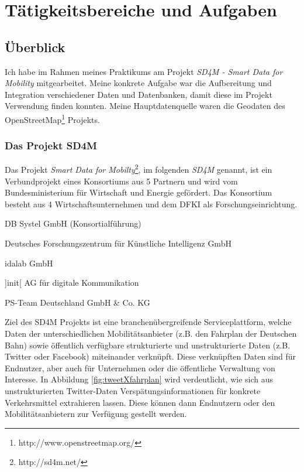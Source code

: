 \chapter{Tätigkeitsbereiche und Aufgaben}
\label{sec:main}
\section{Überblick}
\label{sec:main:overview}
Ich habe im Rahmen meines Praktikums am Projekt \textit{SD4M - Smart Data for Mobility} mitgearbeitet.
Meine konkrete Aufgabe war die Aufbereitung und Integration verschiedener Daten und Datenbanken, damit diese im Projekt Verwendung finden konnten. Meine Hauptdatenquelle waren die Geodaten des OpenStreetMap\footnote{http://www.openstreetmap.org/} Projekts.
\subsection{Das Projekt SD4M}
\label{sec:main:overview:sd4m}
Das Projekt \textit{Smart Data for Mobilty}\footnote{http://sd4m.net/}, im folgenden \textit{SD4M} genannt, ist ein Verbundprojekt eines Konsortiums aus 5 Partnern und wird vom Bundesministerium für Wirtschaft und Energie gefördert.
Das Konsortium besteht aus 4 Wirtschaftsunternehmen und dem DFKI als Forschungseinrichtung.
\begin{compactitem}
  \item DB Systel GmbH (Konsortialführung)
  \item Deutsches Forschungszentrum für Künstliche Intelligenz GmbH
  \item idalab GmbH
  \item ]init[ AG für digitale Kommunikation
  \item PS-Team Deutschland GmbH & Co. KG
\end{compactitem}
Ziel des SD4M Projekts ist eine branchenübergreifende Serviceplattform, welche Daten der unterschiedlichen Mobilitätsanbieter (z.B. den Fahrplan der Deutschen Bahn) sowie öffentlich verfügbare strukturierte und unstrukturierte Daten (z.B. Twitter oder Facebook) miteinander verknüpft.
Diese verknüpften Daten sind für Endnutzer, aber auch für Unternehmen oder die öffentliche Verwaltung von Interesse.
In Abbildung \ref{fig:tweetXfahrplan} wird verdeutlicht, wie sich aus unstrukturierten Twitter-Daten Verspätungsinformationen für konkrete Verkehrsmittel extrahieren lassen.
Diese können dann Endnutzern oder den Mobilitätsanbietern zur Verfügung gestellt werden.
